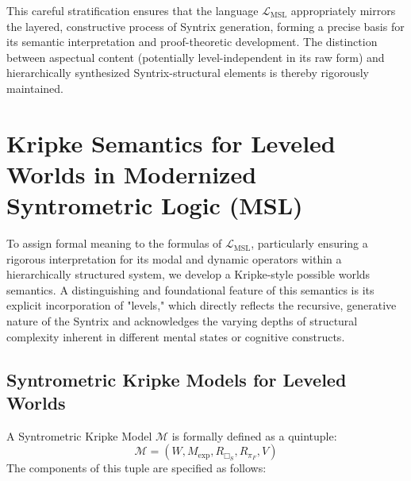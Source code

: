 \documentclass[
    12pt,              %
    a4paper,           %
    headings=normal,   %
    twoside=true,      %
    BCOR=8mm,          %
]{scrbook}
\newcommand{\LMSL}{\mathcal{L}_{\text{MSL}}}
\newcommand{\BoxS}{\Box_S}
\newcommand{\Mexp}{M_{\text{exp}}}
\begin{document}
This careful stratification ensures that the language \(\LMSL\) appropriately mirrors the layered, constructive process of Syntrix generation, forming a precise basis for its semantic interpretation and proof-theoretic development. The distinction between aspectual content (potentially level-independent in its raw form) and hierarchically synthesized Syntrix-structural elements is thereby rigorously maintained.

\section*{Kripke Semantics for Leveled Worlds in Modernized Syntrometric Logic (MSL)}

To assign formal meaning to the formulas of \(\LMSL\), particularly ensuring a rigorous interpretation for its modal and dynamic operators within a hierarchically structured system, we develop a Kripke-style possible worlds semantics. A distinguishing and foundational feature of this semantics is its explicit incorporation of "levels," which directly reflects the recursive, generative nature of the Syntrix and acknowledges the varying depths of structural complexity inherent in different mental states or cognitive constructs.

\subsection*{Syntrometric Kripke Models for Leveled Worlds}

A Syntrometric Kripke Model \(\mathcal{M}\) is formally defined as a quintuple:
\[ \mathcal{M} = (W, \Mexp, R_{\BoxS}, R_{\pi_F}, V) \]
The components of this tuple are specified as follows:
\end{document}
